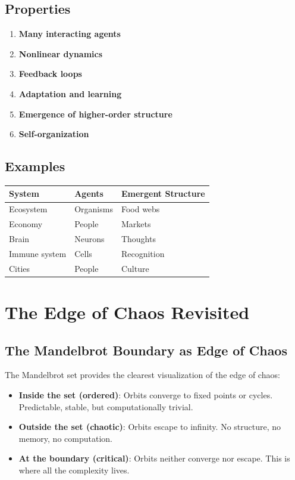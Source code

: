 \documentclass[
  11pt,
  letterpaper,
  twoside,
  openright]{book}
\providecommand{\tightlist}{%
  \setlength{\itemsep}{0pt}\setlength{\parskip}{0pt}}
\begin{document}
\subsection{Properties}\label{properties-23}

\begin{enumerate}
\def\labelenumi{\arabic{enumi}.}
\tightlist
\item
  \textbf{Many interacting agents}
\item
  \textbf{Nonlinear dynamics}
\item
  \textbf{Feedback loops}
\item
  \textbf{Adaptation and learning}
\item
  \textbf{Emergence of higher-order structure}
\item
  \textbf{Self-organization}
\end{enumerate}

\subsection{Examples}\label{examples-8}

\begin{longtable}[]{@{}lll@{}}
\toprule\noalign{}
System & Agents & Emergent Structure \\
\midrule\noalign{}
\endhead
\bottomrule\noalign{}
\endlastfoot
Ecosystem & Organisms & Food webs \\
Economy & People & Markets \\
Brain & Neurons & Thoughts \\
Immune system & Cells & Recognition \\
Cities & People & Culture \\
\end{longtable}

\section{The Edge of Chaos Revisited}\label{the-edge-of-chaos-revisited}

\subsection{The Mandelbrot Boundary as Edge of
Chaos}\label{the-mandelbrot-boundary-as-edge-of-chaos}

The Mandelbrot set provides the clearest visualization of the edge of
chaos:

\begin{itemize}
\tightlist
\item
  \textbf{Inside the set (ordered)}: Orbits converge to fixed points or
  cycles. Predictable, stable, but computationally trivial.
\item
  \textbf{Outside the set (chaotic)}: Orbits escape to infinity. No
  structure, no memory, no computation.
\item
  \textbf{At the boundary (critical)}: Orbits neither converge nor
  escape. This is where all the complexity lives.
\end{itemize}
\end{document}
